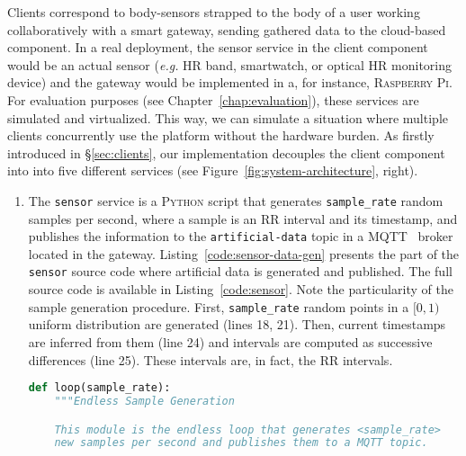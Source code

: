 Clients correspond to body-sensors strapped to the body of a user working collaboratively with a smart gateway, sending gathered data to the cloud-based component. 
In a real deployment, the sensor service in the client component would be an actual sensor (\textit{e.g.} HR band, smartwatch, or optical HR monitoring device) and the gateway would be implemented in a, for instance, \textsc{Raspberry Pi}.
For evaluation purposes (see Chapter~\ref{chap:evaluation}), these services are simulated and virtualized.
This way, we can simulate a situation where multiple clients concurrently use the platform without the hardware burden.
As firstly introduced in \S\ref{sec:clients}, our implementation decouples the client component into into five different services (see Figure~\ref{fig:system-architecture}, right). 
\begin{enumerate}
    \item The \texttt{sensor} service is a \textsc{Python} script that generates \texttt{sample\_rate} random samples per second, where a sample is an RR interval and its timestamp, and publishes the information to the \texttt{artificial-data} topic in a \textsc{MQTT}~\cite{mqtt-protocol} broker located in the gateway. Listing~\ref{code:sensor-data-gen} presents the part of the \texttt{sensor} source code where artificial data is generated and published. The full source code is available in Listing~\ref{code:sensor}. Note the particularity of the sample generation procedure. First, \texttt{sample\_rate} random points in a $[0, 1)$ uniform distribution are generated (lines 18, 21). Then, current timestamps are inferred from them (line 24) and intervals are computed as successive differences (line 25). These intervals are, in fact, the RR intervals.
\begin{lstlisting}[language=Python,caption={Snippet illustrating the artificial data generation in the \texttt{sensor} service.},label=code:sensor-data-gen]
def loop(sample_rate):
    """Endless Sample Generation

    This module is the endless loop that generates <sample_rate>
    new samples per second and publishes them to a MQTT topic.


\end{lstlisting}
\end{enumerate}
